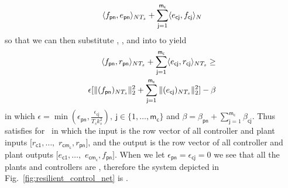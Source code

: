 \begin{IEEEproof}
\begin{align}
\langle f_{\mathsf{pn}},e_{\mathsf{pn}} \rangle_{NT_s} + 
\sum_{\mathsf{j}=1}^{\mathsf{m_c}} \langle e_{\mathsf{cj}},f_{\mathsf{cj}} \rangle_N
\end{align}
so that we can then substitute , 
, and  into  to yield 
\begin{align}
\label{E:main_l2_inequality_final}
\langle f_{\mathsf{pn}},r_{\mathsf{pn}} \rangle_{NT_s} +
\sum_{\mathsf{j}=1}^{\mathsf{m_c}} \langle e_{\mathsf{cj}},r_{\mathsf{cj}} \rangle_{NT_s} \geq \nonumber\\ 
\epsilon[\|(f_{\mathsf{pn}})_{NT_s}\|_{2}^2 + 
\sum_{\mathsf{j}=1}^{\mathsf{m_c}} \|(e_{\mathsf{cj}})_{NT_s}\|_{2}^2] - \beta
\end{align}
in which $\epsilon = \min(\epsilon_{\mathsf{pn}},\frac{\epsilon_{\mathsf{cj}}}{T_s
  k_s^2}),\ \mathsf{j} \in \{1,\dots,\mathsf{m_c}\}$ and $\beta =
\beta_{\mathsf{pn}} + \sum_{\mathsf{j}=1}^{\mathsf{m_c}} \beta_{\mathsf{cj}}$.
Thus  satisfies \cite[Definition~4-iii)]{kottenstette08:_contr_of_multip_networ_passiv}
for \sopy\ in which the input is the row vector of all controller and
plant inputs $[r_{\mathsf{c1}},\dots,$ $r_{\mathsf{cm_c}},r_{\mathsf{pn}}]$, and
the output is the row vector of all controller and plant outputs
$[e_{\mathsf{c1}},\dots,$ $e_{\mathsf{cm_c}},f_{\mathsf{pn}}]$.  When we let
$\epsilon_{\mathsf{pn}} = \epsilon_{\mathsf{cj}} = 0$ we see that all the plants and
controllers are \passive, therefore the system depicted in
Fig.~\ref{fig:resilient_control_net} is \passive.
\end{IEEEproof}